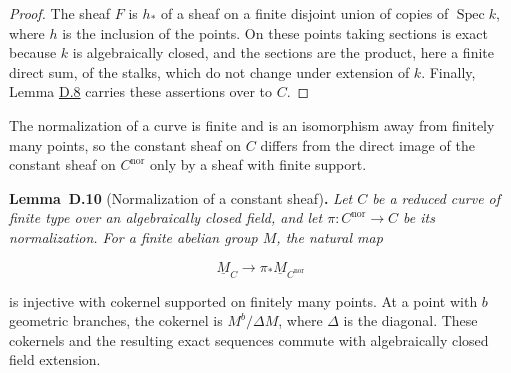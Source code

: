 \documentclass[11pt]{article}
\newenvironment{bpstatement}[2]{\par\addvspace{0.6\baselineskip}\noindent\textbf{#1}#2\textbf{.}\enspace\ignorespaces}
  {\par\addvspace{0.4\baselineskip}}
\newenvironment{bpstatementit}[2]{\begin{bpstatement}{#1}{#2}\itshape\ignorespaces}{\end{bpstatement}}
\begin{document}
\begin{proof}[{Proof}]\label{bp32}%
The sheaf \(F\) is \(h_*\) of a sheaf on a finite disjoint union of copies of \(\operatorname{Spec}k\), where \(h\) is the inclusion of the points. On these points taking sections is exact because \(k\) is algebraically closed, and the sections are the product, here a finite direct sum, of the stalks, which do not change under extension of \(k\). Finally, Lemma \hyperref[bp28]{D.8} carries these assertions over to \(C\).
\end{proof}

\label{bp33}%
The normalization of a curve is finite and is an isomorphism away from finitely many points, so the constant sheaf on \(C\) differs from the direct image of the constant sheaf on \(C^{\mathrm{nor}}\) only by a sheaf with finite support.

\label{bp34}%
\begin{bpstatementit}{Lemma~D.10}{ (Normalization of a constant sheaf)}
Let \(C\) be a reduced curve of finite type over an algebraically closed field, and let \(\pi:C^{\mathrm{nor}}\to C\) be its normalization.  For a finite abelian group \(M\), the natural map

\[
\underline M_C\longrightarrow \pi_*\underline M_{C^{\mathrm{nor}}}
\]

is injective with cokernel supported on finitely many points.  At a point with \(b\) geometric branches, the cokernel is \(M^b/\Delta M\), where \(\Delta\) is the diagonal. These cokernels and the resulting exact sequences commute with algebraically closed field extension.
\end{bpstatementit}
\end{document}
